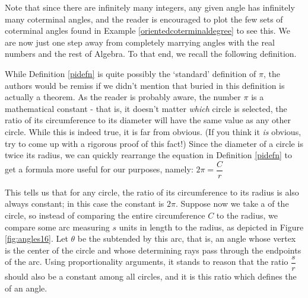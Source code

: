 \medskip

Note that since there are infinitely many integers, any given angle has infinitely many coterminal angles, and the reader is encouraged to plot the few sets of coterminal angles found in Example \ref{orientedcoterminaldegree} to see this.  We are now just one step away from completely marrying angles with the real numbers and the rest of Algebra.  To that end, we recall the following definition.


\smallskip


\smallskip

While Definition \ref{pidefn} is quite possibly the `standard' definition of $\pi$, the authors would be remiss if we didn't mention that buried in this definition is actually a theorem.  As the reader is probably aware, the number $\pi$ is a mathematical constant - that is, it doesn't matter \textit{which} circle is selected, the ratio of its circumference to its diameter will have the same value as any other circle.  While this is indeed true, it is far from obvious. (If you think it \textit{is} obvious, try to come up with a rigorous proof of this fact!)   Since the diameter of a circle is twice its radius, we can quickly rearrange the equation in Definition \ref{pidefn} to get a formula more useful for our purposes, namely: $2 \pi = \dfrac{C}{r}$

This tells us that for any circle, the ratio of its circumference to its radius is also always constant; in this case the constant is $2\pi$.  Suppose now we take a  of the circle, so instead of comparing the entire circumference $C$ to the radius, we compare some arc measuring $s$ units in length to the radius, as depicted in Figure \ref{fig:angles16}.  Let $\theta$ be the  subtended by this arc, that is, an angle whose vertex is the center of the circle and whose determining rays pass through the endpoints of the arc.  Using proportionality arguments, it stands to reason that the ratio $\dfrac{s}{r}$ should also be a constant among all circles, and it is this ratio which defines the  of an angle.

